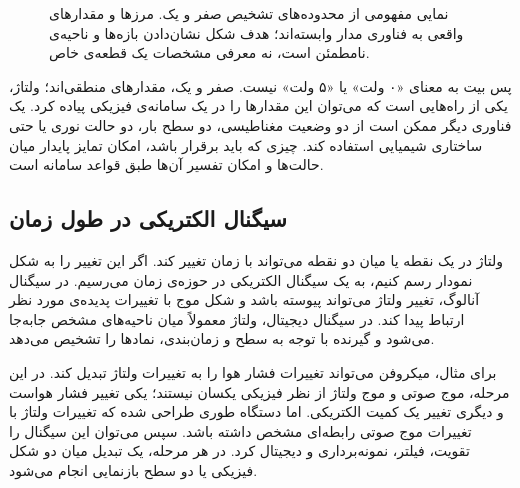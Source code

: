\begin{figure}[htbp]
\centering
{}
\caption{نمایی مفهومی از محدوده‌های تشخیص صفر و یک. مرزها و مقدارهای واقعی به فناوری مدار وابسته‌اند؛ هدف شکل نشان‌دادن بازه‌ها و ناحیه‌ی نامطمئن است، نه معرفی مشخصات یک قطعه‌ی خاص.}
\label{fig:logic-voltage-ranges}
\end{figure}

پس بیت به معنای «۰ ولت» یا «۵ ولت» نیست. صفر و یک، مقدارهای منطقی‌اند؛ ولتاژ، یکی از راه‌هایی است که می‌توان این مقدارها را در یک سامانه‌ی فیزیکی پیاده کرد. یک فناوری دیگر ممکن است از دو وضعیت مغناطیسی، دو سطح بار، دو حالت نوری یا حتی ساختاری شیمیایی استفاده کند. چیزی که باید برقرار باشد، امکان تمایز پایدار میان حالت‌ها و امکان تفسیر آن‌ها طبق قواعد سامانه است.

\subsection{سیگنال الکتریکی در طول زمان}
\label{sub:electrical-signal-over-time}

ولتاژ در یک نقطه یا میان دو نقطه می‌تواند با زمان تغییر کند. اگر این تغییر را به شکل نمودار رسم کنیم، به یک سیگنال الکتریکی در حوزه‌ی زمان می‌رسیم. در سیگنال آنالوگ، تغییر ولتاژ می‌تواند پیوسته باشد و شکل موج با تغییرات پدیده‌ی مورد نظر ارتباط پیدا کند. در سیگنال دیجیتال، ولتاژ معمولاً میان ناحیه‌های مشخص جابه‌جا می‌شود و گیرنده با توجه به سطح و زمان‌بندی، نمادها را تشخیص می‌دهد.

برای مثال، میکروفن می‌تواند تغییرات فشار هوا را به تغییرات ولتاژ تبدیل کند. در این مرحله، موج صوتی و موج ولتاژ از نظر فیزیکی یکسان نیستند؛ یکی تغییر فشار هواست و دیگری تغییر یک کمیت الکتریکی. اما دستگاه طوری طراحی شده که تغییرات ولتاژ با تغییرات موج صوتی رابطه‌ای مشخص داشته باشد. سپس می‌توان این سیگنال را تقویت، فیلتر، نمونه‌برداری و دیجیتال کرد. در هر مرحله، یک تبدیل میان دو شکل فیزیکی یا دو سطح بازنمایی انجام می‌شود.

